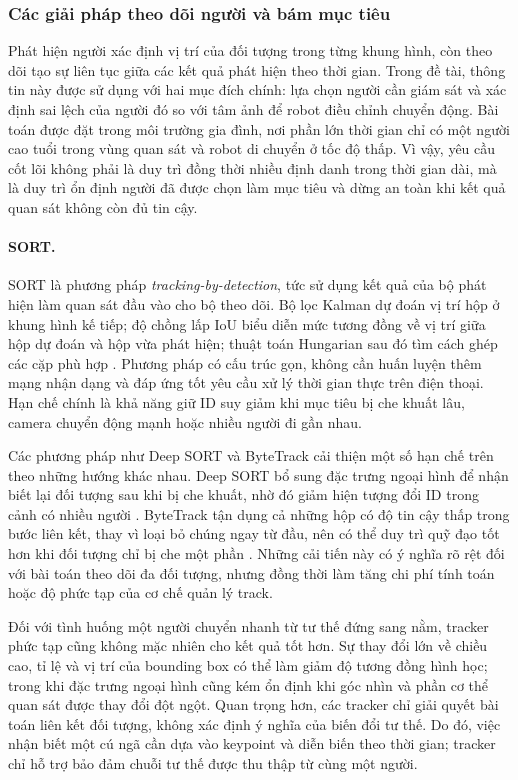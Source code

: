 \fi

\subsubsection{Các giải pháp theo dõi người và bám mục tiêu}

Phát hiện người xác định vị trí của đối tượng trong từng khung hình, còn theo dõi tạo sự liên tục giữa các kết quả phát hiện theo thời gian. Trong đề tài, thông tin này được sử dụng với hai mục đích chính: lựa chọn người cần giám sát và xác định sai lệch của người đó so với tâm ảnh để robot điều chỉnh chuyển động. Bài toán được đặt trong môi trường gia đình, nơi phần lớn thời gian chỉ có một người cao tuổi trong vùng quan sát và robot di chuyển ở tốc độ thấp. Vì vậy, yêu cầu cốt lõi không phải là duy trì đồng thời nhiều định danh trong thời gian dài, mà là duy trì ổn định người đã được chọn làm mục tiêu và dừng an toàn khi kết quả quan sát không còn đủ tin cậy.

\paragraph{SORT.}
SORT là phương pháp \textit{tracking-by-detection}, tức sử dụng kết quả của bộ phát hiện làm quan sát đầu vào cho bộ theo dõi. Bộ lọc Kalman dự đoán vị trí hộp ở khung hình kế tiếp; độ chồng lấp IoU biểu diễn mức tương đồng về vị trí giữa hộp dự đoán và hộp vừa phát hiện; thuật toán Hungarian sau đó tìm cách ghép các cặp phù hợp . Phương pháp có cấu trúc gọn, không cần huấn luyện thêm mạng nhận dạng và đáp ứng tốt yêu cầu xử lý thời gian thực trên điện thoại. Hạn chế chính là khả năng giữ ID suy giảm khi mục tiêu bị che khuất lâu, camera chuyển động mạnh hoặc nhiều người đi gần nhau.

Các phương pháp như Deep SORT và ByteTrack cải thiện một số hạn chế trên theo những hướng khác nhau. Deep SORT bổ sung đặc trưng ngoại hình để nhận biết lại đối tượng sau khi bị che khuất, nhờ đó giảm hiện tượng đổi ID trong cảnh có nhiều người . ByteTrack tận dụng cả những hộp có độ tin cậy thấp trong bước liên kết, thay vì loại bỏ chúng ngay từ đầu, nên có thể duy trì quỹ đạo tốt hơn khi đối tượng chỉ bị che một phần . Những cải tiến này có ý nghĩa rõ rệt đối với bài toán theo dõi đa đối tượng, nhưng đồng thời làm tăng chi phí tính toán hoặc độ phức tạp của cơ chế quản lý track.

Đối với tình huống một người chuyển nhanh từ tư thế đứng sang nằm, tracker phức tạp cũng không mặc nhiên cho kết quả tốt hơn. Sự thay đổi lớn về chiều cao, tỉ lệ và vị trí của bounding box có thể làm giảm độ tương đồng hình học; trong khi đặc trưng ngoại hình cũng kém ổn định khi góc nhìn và phần cơ thể quan sát được thay đổi đột ngột. Quan trọng hơn, các tracker chỉ giải quyết bài toán liên kết đối tượng, không xác định ý nghĩa của biến đổi tư thế. Do đó, việc nhận biết một cú ngã cần dựa vào keypoint và diễn biến theo thời gian; tracker chỉ hỗ trợ bảo đảm chuỗi tư thế được thu thập từ cùng một người.

